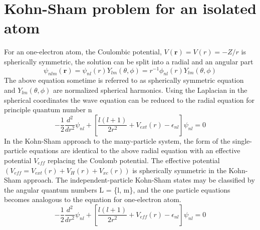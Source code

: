 \section{Kohn-Sham problem for an isolated atom}
For an one-electron atom, the Coulombic potential, $V(\mathbf{r}) = V(r) = -Z/r$ is spherically symmetric, the solution can be split into a radial and an angular part 
\begin{equation}
\label{eq_rad_ang}
\psi_{nlm} (\mathbf{r}) = \psi_{nl}(r) Y_{lm}(\theta,\phi) = r^{-1} \phi_{nl}(r) Y_{lm} (\theta,\phi)
\end{equation}
The above equation sometime is referred to as spherically symmetric \schrod equation and $Y_{lm}(\theta, \phi)$ are normalized spherical harmonics. Using the Laplacian in the spherical coordinates the wave equation can be reduced to the radial equation for principle quantum number n
\begin{equation}
\label{eq_radial}
-\frac{1}{2}\frac{d^2}{dr^2} \psi_{nl} + \left [ \frac{l(l+1)}{2r^2} + V_{ext}(r) - \epsilon_{nl} \right ] \psi_{nl} = 0
\end{equation}
In the Kohn-Sham approach to the many-particle system, the form of the single-particle equations are identical to the above radial \schrod equation with an effective potential $V_{eff}$ replacing the Coulomb potential. The effective potential $(V_{eff} = V_{ext}(r) + V_{H} (r) + V_{xc} (r))$ is spherically symmetric in the Kohn-Sham approach. The independent-particle Kohn-Sham states may be classified by the angular quantum numbers L = \{l, m\}, and the one particle equations becomes analogous to the \schrod equation for one-electron atom. 
\begin{equation}
\label{eq_oneparticle}
-\frac{1}{2}\frac{d^2}{dr^2} \psi_{nl} + \left [ \frac{l(l+1)}{2r^2} + V_{eff}(r) - \epsilon_{nl} \right ] \psi_{nl} = 0
\end{equation}

